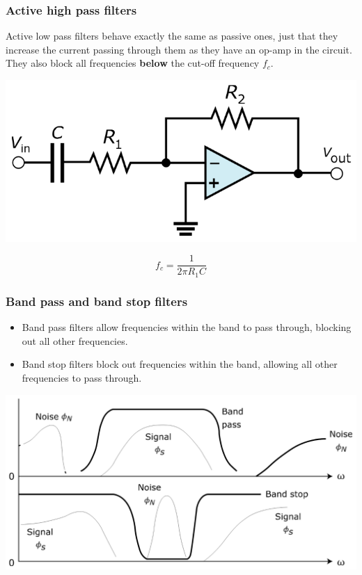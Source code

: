 \documentclass[11pt]{article}
\begin{document}
 \newpage

\subsubsection{Active high pass filters}
\label{sec:orgf95592d}
Active low pass filters behave exactly the same as passive ones, just that they increase the current passing through them as they have an op-amp in the circuit. They also block all frequencies \textbf{below} the cut-off frequency \(f_c\).
\begin{center}
\includegraphics[width=.9\linewidth]{./images/active-high-pass-filter.png}
\end{center}
\[f_c = \frac{1}{2 \pi R_1 C}\]

 \newpage

\subsubsection{Band pass and band stop filters}
\label{sec:org2f70c8f}
\begin{itemize}
\item Band pass filters allow frequencies within the band to pass through, blocking out all other frequencies.
\item Band stop filters block out frequencies within the band, allowing all other frequencies to pass through.
\end{itemize}
\begin{center}
\includegraphics[width=.9\linewidth]{./images/band-pass-and-band-stop-filters.png}
\end{center}
\end{document}
